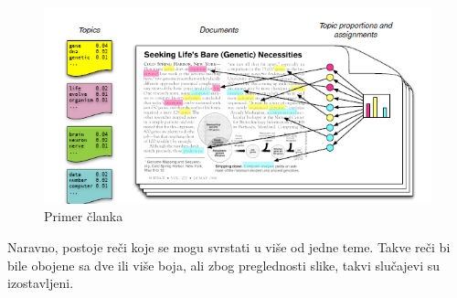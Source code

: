 \documentclass[12pt,a4paper]{article}
\begin{document}
\begin{figure}[h!]
    \centering
    \includegraphics[scale=0.7]{tm.png}
	\caption{Primer \v clanka}
	\label{fig:tmSlika1}
\end{figure}


Naravno, postoje re\v ci koje se mogu svrstati u vi\v se od jedne teme. Takve re\v ci bi bile obojene sa dve ili vi\v se boja, ali zbog preglednosti slike, takvi slu\v cajevi su izostavljeni.
\newpage
\end{document}

